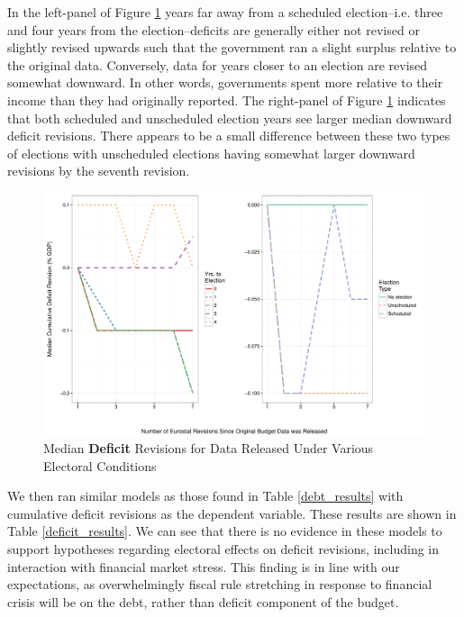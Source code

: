 \documentclass[]{article}
\begin{document}
In the left-panel of Figure \ref{median_deficit_revisions} years far away from a scheduled election--i.e. three and four years from the election--deficits are generally either not revised or slightly revised upwards such that the government ran a slight surplus relative to the original data. Conversely, data for years closer to an election are revised somewhat downward. In other words, governments spent more relative to their income than they had originally reported. The right-panel of Figure \ref{median_deficit_revisions} indicates that both scheduled and unscheduled election years see larger median downward deficit revisions. There appears to be a small difference between these two types of elections with unscheduled elections having somewhat larger downward revisions by the seventh revision.

\begin{figure}
    \begin{center}
        \caption{Median \textbf{Deficit} Revisions for Data Released Under Various Electoral Conditions}
        \label{median_deficit_revisions}
        \includegraphics[scale=0.55]{figures/median_deficit_revisions.pdf}
    \end{center}
\end{figure}


We then ran similar models as those found in Table \ref{debt_results} with cumulative deficit revisions as the dependent variable. These results are shown in Table \ref{deficit_results}. We can see that there is no evidence in these models to support hypotheses regarding electoral effects on deficit revisions, including in interaction with financial market stress. This finding is in line with our expectations, as overwhelmingly fiscal rule stretching in response to financial crisis will be on the debt, rather than deficit component of the budget.

\begin{landscape}
    
\end{landscape}
\end{document}
